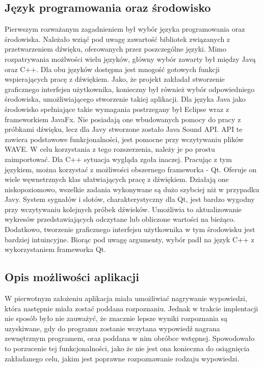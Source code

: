 \documentclass[a4paper,12 pt]{article}
\begin{document}
\subsection{Język programowania oraz środowisko}
Pierwszym rozważanym zagadnieniem był wybór języka programowania oraz środowiska. Należało wziąć pod uwagę zawartość bibliotek związanych z przetwarzeniem dźwięku, oferowanych przez poszczególne języki.
Mimo rozpatrywania możlwości wielu języków, główny wybór zawarty był między Javą oraz C++. Dla obu języków dostępna jest mnogość gotowych funkcji wspierających pracę z dźwiękiem. Jako, że projekt zakładał stworzenie graficznego interfejsu użytkownika, 
konieczny był również wybór odpowiedniego środowiska, umożliwiającego stworzenie takiej aplikacji. Dla języka Java jako środowisko spełniające takie wymagania postrzegany był Eclipse wraz z frameworkiem JavaFx. Nie posiadają one wbudowanych pomocy do pracy z próbkami dźwięku, lecz dla Javy stworzone zostało
Java Sound API. API te zawiera podstawowe funkcjonalności, jest pomocne przy wczytywaniu plików WAVE. W celu korzystania z tego rozszerzenia, należy je po prostu zaimportować. Dla  C++ sytuacja wygląda zgoła inaczej. Pracując z tym językiem, można korzystać z możliwości obszernego frameworka - Qt. Oferuje on wiele węwnetrznych klas ułatwiających pracę z dźwiękiem. Działają one niskopoziomowo, wszelkie zadania wykonywane są dużo szybciej niż w przypadku Javy.  System sygnałów i slotów, charakterystyczny dla Qt, jest bardzo wygodny przy wczytywaniu kolejnych próbek dźwieków. Umożliwia to aktualizowanie wykresów przedstawiających odczytane lub obliczone wartości na bieżąco. Dodatkowo, tworzenie graficznego interfejsu użytkownika w tym środowisku jest bardziej intuincyjne. Biorąc pod uwagę argumenty, wybór padł na język C++ z wykorzystaniem frameworka Qt.

\subsection{Opis możliwości aplikacji}
W pierwotnym założeniu aplikacja miała umożliwiać nagrywanie wypowiedzi, która następnie miała zostać poddana rozpoznaniu. Jednak w trakcie implentacji nie sposób było nie zauważyć, że znacznie lepsze wyniki rozpoznania są uzyskiwane, gdy do programu zostanie wczytana wypowiedź nagrana zewnętrznym programem, oraz poddana w nim obróbce wstępnej. Spowodowało to porzucenie tej funkcjonalności, jako że nie jest ona konieczna do osiągnięcia zakładanego celu, jakim jest poprawne rozpoznawanie rodzaju wypowiedzi.
\end{document}
